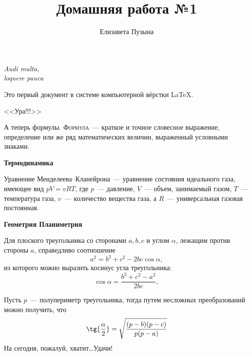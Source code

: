 \documentclass[12pt]{article}
\title{Домашняя работа №1}
\author{Елизавета Пузына}
\date{}
\begin{document}
	\maketitle
	\begin{flushright}

	\textit{Audi multa, \\ loquere pauca}

	\end{flushright}

	\vspace{20pt}Это первый документ в системе компьютерной вёрстки \LaTeX.
	
	\begin{center}
	\huge \textsf{<<Ура!!!>>}
	\end{center}
	
	А теперь формулы. {\textsc{Формула}}~--- краткое и точное словесное выражение, определение или же ряд математических величин, выраженный условными знаками.
	
    \vspace{15pt} \hspace{14pt} {\bfseries \Large Термодинамика}
	
	Уравнение Менделеева--Кланейрона~--- уравнение состояния идеального газа, имеющее вид $pV = vRT$, где $p$~--- давление, $V$~--- объем, занимаемый газом, $T$~--- температура газа, $v$~--- количество вещества газа, а $R$~--- универсальная газовая постоянная.
	
	{\vspace{15pt} \hspace{14pt} \bfseries \Large Геометрия \hfill Планиметрия}
	
    Для плоского треугольника со сторонами $a, b, c$ и углом $\alpha$, лежащим против стороны $a$, справедливо соотношение
	$$
	a^2 = b^2 + c^2 - 2bc\cos{\alpha},
	$$
	из которого можно выразить косинус угла треугольника:
	$$
	\cos{\alpha} = \frac{b^2 + c^2 - a^2}{2bc},
	$$
	
	Пусть $p$~--- полупериметр треугольника, тогда путем несложных преобразований можно получить, что
	$$
	\tg {\frac{\alpha}{2}} = \sqrt{\frac{(p-b)(p-c)}{p(p-a)}}
	$$
	\vspace{1cm} \noindent На сегодня, пожалуй, хватит\dots Удачи!
\end{document}
